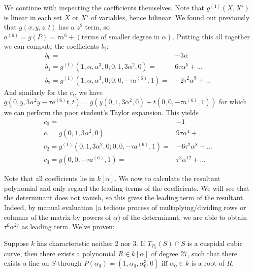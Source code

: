 We continue with inspecting the coefficients themselves.
Note that $g^{(1)}(X,X')$ is linear in each set $X$ or $X'$ of variables, hence bilinear.
We found out previously that $g(x,y,z,t)$ has a $z^2$ term, so $a^{(6)} = g(P) = \tau\alpha^6 + (\text{terms of smaller degree in } \alpha)$.
Putting this all together we can compute the coefficients $b_i$:
\begin{align}
b_0 =& -3\alpha \\
b_1 = g^{(1)}(1,\alpha,\alpha^3,0;0,1,3\alpha^2,0) =& 6\tau\alpha^5 + ... \\
b_2 = g^{(1)}(1,\alpha,\alpha^3,0;0,0,-\tau a^{(6)},1) =& -2\tau^2\alpha^9 + ...
\end{align}
And similarly for the $c_i$, we have $g(0,y,3\alpha^2y-\tau a^{(6)}t,t) = g(y(0,1,3\alpha^2,0)+t(0,0,-\tau a^{(6)},1))$ for which we can perform the poor student's Taylor expansion. This yields
\begin{align}
c_0 =& -1\\
c_1 = g(0,1,3\alpha^2,0) =& 9\tau\alpha^4 + ... \\
c_2 = g^{(1)}(0,1,3\alpha^2,0;0,0,-\tau a^{(6)},1) =& -6\tau^2\alpha^8 + ... \\
c_3 = g(0,0,-\tau a^{(6)},1) =& \tau^3\alpha^{12} + ...
\end{align}

Note that all coefficients lie in $k[\alpha]$.
We now to calculate the resultant polynomial and only regard the leading terms of the coefficients.
We will see that the determinant does not vanish, so this gives the leading term of the resultant.
Indeed, by manual evaluation (a tedious process of multiplying/dividing rows or columns of the matrix by powers of $\alpha$) of the determinant, we are able to obtain $\tau^6\alpha^{27} $ as leading term.
We've proven:
\begin{proposition}
Suppose $k$ has characteristic neither 2 nor 3.
If $T_{P_0}(S) \cap S$ is a cuspidal cubic curve, then there exists a polynomial $R \in k[\alpha]$ of degree 27, such that there exists a line on $S$ through $P(\alpha_0) = (1,\alpha_0,\alpha_0^3,0)$ iff $\alpha_0 \in k$ is a root of $R$.
\end{proposition}

